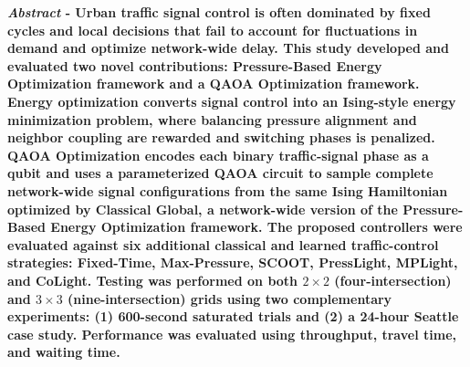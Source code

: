 \textbf{\emph{Abstract} - 
Urban traffic signal control is often dominated by fixed cycles and local decisions that fail to account for fluctuations in demand and optimize network-wide delay. This study developed and evaluated two novel contributions: Pressure-Based Energy Optimization framework and a QAOA Optimization framework. Energy optimization converts signal control into an Ising-style energy minimization problem, where balancing pressure alignment and neighbor coupling are rewarded and switching phases is penalized. QAOA Optimization encodes each binary traffic-signal phase as a qubit and uses a parameterized QAOA circuit to sample complete network-wide signal configurations from the same Ising Hamiltonian optimized by Classical Global, a network-wide version of the Pressure-Based Energy Optimization framework. The proposed controllers were evaluated against six additional classical and learned traffic-control strategies: Fixed-Time, Max-Pressure, SCOOT, PressLight, MPLight, and CoLight. Testing was performed on both $2\times2$ (four-intersection) and $3\times3$ (nine-intersection) grids using two
complementary experiments: (1) 600-second saturated trials and (2) a 24-hour Seattle case study. Performance was evaluated using throughput, travel time, and waiting time.
}

